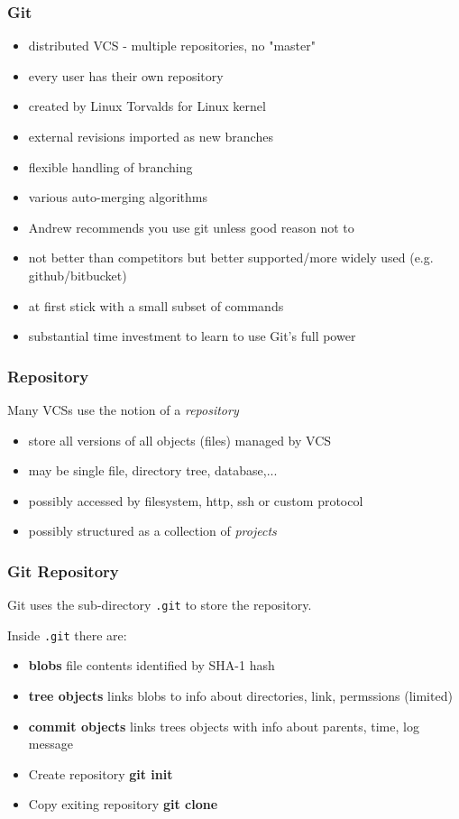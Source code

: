 \begin{frame}
\frametitle{Git}
\begin{itemize}
\item  distributed VCS - multiple repositories, no "master"
\item  every user has their own repository
\item  created by Linux Torvalds for Linux kernel
\item  external revisions imported as new branches
\item  flexible handling of branching
\item  various auto-merging algorithms
\item  Andrew recommends you use git unless good reason not to
\item  not better than competitors but better supported/more widely used (e.g. github/bitbucket)
\item  at first stick with a small subset of commands
\item  substantial time investment to learn to use Git's  full power
\end{itemize}
\end{frame}

\begin{frame}
\frametitle{Repository}
Many VCSs use the notion of a {\em{repository}}

\begin{itemize}
\item  store all versions of all objects (files) managed by VCS
\item  may be  single file, directory tree, database,...
\item  possibly accessed by filesystem, http, ssh or custom protocol
\item  possibly structured as a collection of {\em{projects}}
\end{itemize}


\end{frame}


\begin{frame}
\frametitle{Git Repository}
Git uses the sub-directory {\tt .git} to store the repository.

Inside  {\tt .git} there are:

\begin{itemize}
\item  {\bf blobs} file contents identified by SHA-1 hash
\item  {\bf tree objects} links blobs to info about directories, link, permssions (limited)
\item  {\bf commit objects} links trees objects with info about parents, time, log message
\end{itemize}

\begin{itemize}
\item  Create repository {\bf git init}
\item  Copy exiting repository {\bf git clone}
\end{itemize}
\end{frame}

